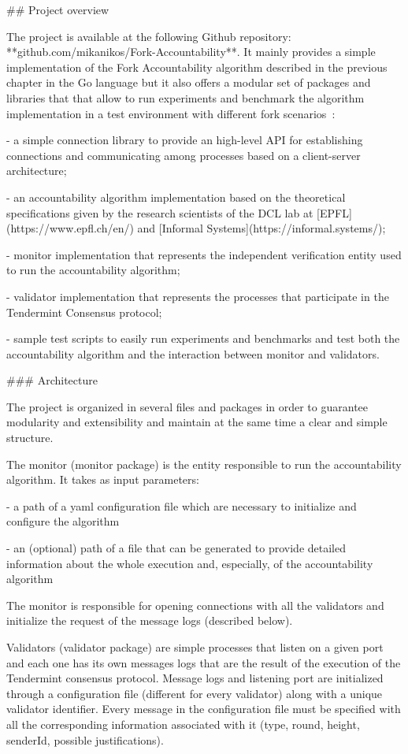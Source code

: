 \documentclass[a4paper,11pt,oneside]{report}
\begin{document}
\begin{markdown}

## Project overview

The project is available at the following Github repository: **github.com/mikanikos/Fork-Accountability**. It mainly provides a simple implementation of the Fork Accountability algorithm described in the previous chapter in the Go language but it also offers a modular set of packages and libraries that that allow to run experiments and benchmark the algorithm implementation in a test environment with different fork scenarios~\cite{github-project}:

- a simple connection library to provide an high-level API for establishing connections and communicating among processes based on a client-server architecture; 

- an accountability algorithm implementation based on the theoretical specifications given by the research scientists of the DCL lab at [EPFL](https://www.epfl.ch/en/) and [Informal Systems](https://informal.systems/);  

- monitor implementation that represents the independent verification entity used to run the accountability algorithm;  

- validator implementation that represents the processes that participate in the Tendermint Consensus protocol; 

- sample test scripts to easily run experiments and benchmarks and test both the accountability algorithm and the interaction between monitor and validators.

### Architecture

The project is organized in several files and packages in order to guarantee modularity and extensibility and maintain at the same time a clear and simple structure.

The monitor (monitor package) is the entity responsible to run the accountability algorithm. It takes as input parameters:

- a path of a yaml configuration file which are necessary to initialize and configure the algorithm

- an (optional) path of a file that can be generated to provide detailed information about the whole execution and, especially, of the accountability algorithm

The monitor is responsible for opening connections with all the validators and initialize the request of the message logs (described below).

Validators (validator package) are simple processes that listen on a given port and each one has its own messages logs that are the result of the execution of the Tendermint consensus protocol. Message logs and listening port are initialized through a configuration file (different for every validator) along with a unique validator identifier.
Every message in the configuration file must be specified with all the corresponding information associated with it (type, round, height, senderId, possible justifications).


\end{markdown}
\end{document}
